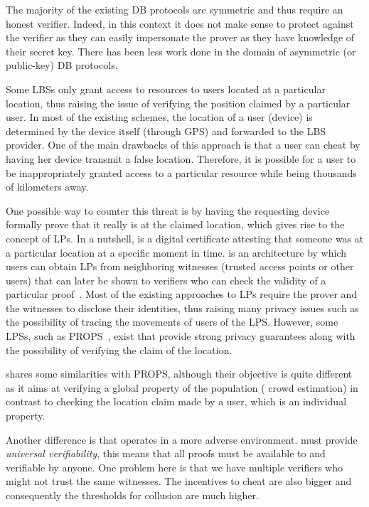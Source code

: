 The majority of the existing \ac{DB} protocols are symmetric and thus require an honest verifier.
Indeed, in this context it does not make sense to protect against the verifier as they can easily impersonate the prover as they have knowledge of their secret key.
There has been less work done in the domain of asymmetric (or public-key) \ac{DB} protocols.

Some \acp{LBS} only grant access to resources to users located at a particular 
location, thus raising the issue of verifying the position claimed by a 
particular user.
In most of the existing schemes, the location of a user (device) is determined 
by the device itself (\eg through GPS) and forwarded to the \ac{LBS} provider.
One of the main drawbacks of this approach is that a user can cheat by having 
her device transmit a false location.
Therefore, it is possible for a user to be inappropriately granted access to a 
particular resource while being thousands of kilometers away.

One possible way to counter this threat is by having the requesting device 
formally prove that it really is at the claimed location, which gives rise to 
the concept of \acp{LP}.
In a nutshell,  is a digital certificate attesting that someone was at 
a particular location at a specific moment in time.
 is an architecture by which users can obtain \acp{LP} from 
neighboring witnesses (\eg trusted access points or other users) that can later 
be shown to verifiers who can check the validity of a particular 
proof~\cite{luo2010veriplace,zhu2011applaus}.
Most of the existing approaches to \acp{LP} require the prover and the 
witnesses to disclose their identities, thus raising many privacy issues such 
as the possibility of tracing the movements of users of the \ac{LPS}.
However, some \acp{LPS}, such as PROPS~\cite{PROPS}, exist that provide strong 
privacy guarantees along with the possibility of verifying the claim of the 
location.

\CROCUS shares some similarities with PROPS, although their objective is quite 
different as it aims at verifying a global property of the population (\ie 
crowd estimation) in contrast to checking the location claim made by a user, 
which is an individual property.

Another difference is that \CROCUS operates in a more adverse environment.
\CROCUS must provide \emph{universal verifiability}, this means that all proofs 
must be available to and verifiable by anyone.
One problem here is that we have multiple verifiers who might not trust the 
same witnesses.
The incentives to cheat are also bigger and consequently the thresholds for 
collusion are much higher.

